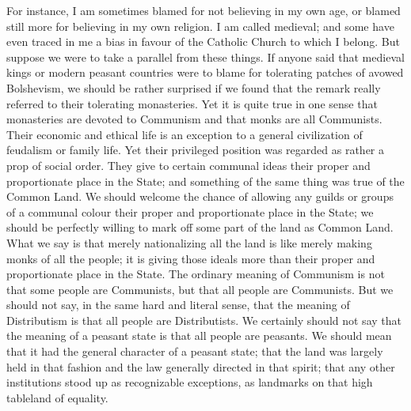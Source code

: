 \documentclass{book}
\begin{document}
For instance, I am sometimes blamed for not believing in my own age, or blamed still more for believing in my own religion. I am called medieval; and some have even traced in me a bias in favour of the Catholic Church to which I belong. But suppose we were to take a parallel from these things. If anyone said that medieval kings or modern peasant countries were to blame for tolerating patches of avowed Bolshevism, we should be rather surprised if we found that the remark really referred to their tolerating monasteries. Yet it is quite true in one sense that monasteries are devoted to Communism and that monks are all Communists. Their economic and ethical life is an exception to a general civilization of feudalism or family life. Yet their privileged position was regarded as rather a prop of social order. They give to certain communal ideas their proper and proportionate place in the State; and something of the same thing was true of the Common Land. We should welcome the chance of allowing any guilds or groups of a communal colour their proper and proportionate place in the State; we should be perfectly willing to mark off some part of the land as Common Land. What we say is that merely nationalizing all the land is like merely making monks of all the people; it is giving those ideals more than their proper and proportionate place in the State. The ordinary meaning of Communism is not that some people are Communists, but that all people are Communists. But we should not say, in the same hard and literal sense, that the meaning of Distributism is that all people are Distributists. We certainly should not say that the meaning of a peasant state is that all people are peasants. We should mean that it had the general character of a peasant state; that the land was largely held in that fashion and the law generally directed in that spirit; that any other institutions stood up as recognizable exceptions, as landmarks on that high tableland of equality.
\end{document}
